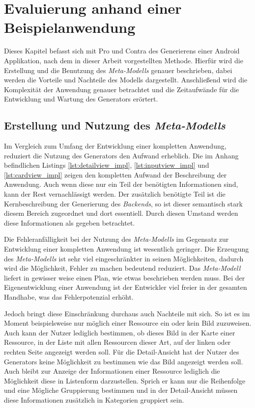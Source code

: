 \chapter{Evaluierung anhand einer Beispielanwendung}
Dieses Kapitel befasst sich mit Pro und Contra des Generierens einer Android Applikation, nach dem in dieser Arbeit vorgestellten Methode.
Hierfür wird die Erstellung und die Benutzung des \textit{Meta-Modells} genauer beschrieben, dabei werden die Vorteile und Nachteile des Modells dargestellt. Anschließend wird die Komplexität der Anwendung genauer betrachtet und die Zeitaufwände für die Entwicklung und Wartung des Generators erörtert.

\section{Erstellung und Nutzung des \textit{Meta-Modells}}

Im Vergleich zum Umfang der Entwicklung einer kompletten Anwendung, reduziert die Nutzung des Generators den Aufwand erheblich. Die im Anhang befindlichen Listings \ref{lst:detailview_impl}, \ref{lst:inputview_impl} und \ref{lst:cardview_impl} zeigen den kompletten Aufwand der Beschreibung der Anwendung. Auch wenn diese nur ein Teil der benötigten Informationen sind, kann der Rest vernachlässigt werden. Der zusätzlich benötigte Teil ist die Kernbeschreibung der Generierung des \textit{Backends}, so ist dieser semantisch stark diesem Bereich zugeordnet und dort essentiell. Durch diesen Umstand werden diese Informationen als gegeben betrachtet.

Die Fehleranfälligkeit bei der Nutzung des \textit{Meta-Modells} im Gegensatz zur Entwicklung einer kompletten Anwendung ist wesentlich geringer. Die Erzeugung des \textit{Meta-Modells} ist sehr viel eingeschränkter in seinen Möglichkeiten, dadurch wird die Möglichkeit, Fehler zu machen bedeutend reduziert. Das \textit{Meta-Modell} liefert in gewisser weise einen Plan, wie etwas beschrieben werden muss. Bei der Eigenentwicklung einer Anwendung ist der Entwickler viel freier in der gesamten Handhabe, was das Fehlerpotenzial erhöht.

Jedoch bringt diese Einschränkung durchaus auch Nachteile mit sich. So ist es im Moment beispielsweise nur möglich einer Ressource ein oder kein Bild zuzuweisen. Auch kann der Nutzer lediglich bestimmen, ob dieses Bild in der Karte einer Ressource, in der Liste mit allen Ressourcen dieser Art, auf der linken oder rechten Seite angezeigt werden soll. Für die Detail-Ansicht hat der Nutzer des Generators keine Möglichkeit zu bestimmen wie das Bild angezeigt werden soll.
Auch bleibt zur Anzeige der Informationen einer Ressource lediglich die Möglichkeit diese in Listenform darzustellen. Sprich er kann nur die Reihenfolge und eine Mögliche Gruppierung bestimmen und in der Detail-Ansicht müssen diese Informationen zusätzlich in Kategorien gruppiert sein. 


